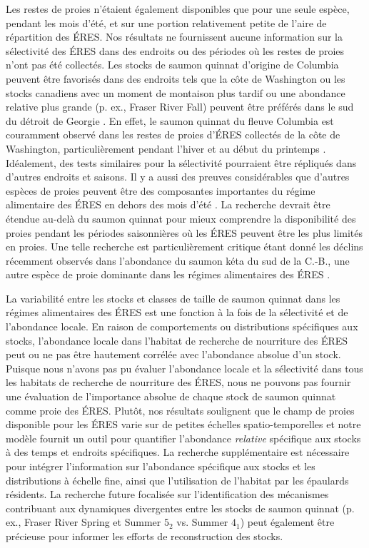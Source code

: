 Les restes de proies n'étaient également disponibles que pour une seule espèce, pendant les mois d'été, et sur une portion relativement petite de l'aire de répartition des ÉRES. Nos résultats ne fournissent aucune information sur la sélectivité des ÉRES dans des endroits ou des périodes où les restes de proies n'ont pas été collectés. Les stocks de saumon quinnat d'origine de Columbia peuvent être favorisés dans des endroits tels que la côte de Washington \citep{sheltonUsingHierarchicalModels2019} ou les stocks canadiens avec un moment de montaison plus tardif ou une abondance relative plus grande (p. ex., Fraser River Fall) peuvent être préférés dans le sud du détroit de Georgie \citep{freshwaterIntegratedModelSeasonal2021}. En effet, le saumon quinnat du fleuve Columbia est couramment observé dans les restes de proies d'ÉRES collectés de la côte de Washington, particulièrement pendant l'hiver et au début du printemps \citep{hansonEndangeredPredatorsEndangered2021}. Idéalement, des tests similaires pour la sélectivité pourraient être répliqués dans d'autres endroits et saisons. Il y a aussi des preuves considérables que d'autres espèces de proies peuvent être des composantes importantes du régime alimentaire des ÉRES en dehors des mois d'été \citep{hansonEndangeredPredatorsEndangered2021, vanciseSpatialSeasonalForaging2024}. La recherche devrait être étendue au-delà du saumon quinnat pour mieux comprendre la disponibilité des proies pendant les périodes saisonnières où les ÉRES peuvent être les plus limités en proies. Une telle recherche est particulièrement critique étant donné les déclins récemment observés dans l'abondance du saumon kéta du sud de la C.-B., une autre espèce de proie dominante dans les régimes alimentaires des ÉRES \citep{hansonEndangeredPredatorsEndangered2021, vanciseSpatialSeasonalForaging2024}.

La variabilité entre les stocks et classes de taille de saumon quinnat dans les régimes alimentaires des ÉRES est une fonction à la fois de la sélectivité et de l'abondance locale. En raison de comportements ou distributions spécifiques aux stocks, l'abondance locale dans l'habitat de recherche de nourriture des ÉRES peut ou ne pas être hautement corrélée avec l'abondance absolue d'un stock. Puisque nous n'avons pas pu évaluer l'abondance locale et la sélectivité dans tous les habitats de recherche de nourriture des ÉRES, nous ne pouvons pas fournir une évaluation de l'importance absolue de chaque stock de saumon quinnat comme proie des ÉRES. Plutôt, nos résultats soulignent que le champ de proies disponible pour les ÉRES varie sur de petites échelles spatio-temporelles et notre modèle fournit un outil pour quantifier l'abondance \textit{relative} spécifique aux stocks à des temps et endroits spécifiques. La recherche supplémentaire est nécessaire pour intégrer l'information sur l'abondance spécifique aux stocks et les distributions à échelle fine, ainsi que l'utilisation de l'habitat par les épaulards résidents. La recherche future focalisée sur l'identification des mécanismes contribuant aux dynamiques divergentes entre les stocks de saumon quinnat (p. ex., Fraser River Spring et Summer $5_2$ vs. Summer $4_1$) peut également être précieuse pour informer les efforts de reconstruction des stocks.

